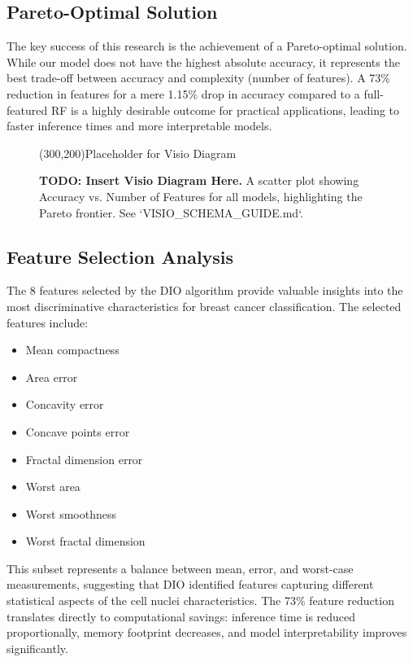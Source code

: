 \documentclass[12pt, a4paper]{article}
\begin{document}
\subsection{Pareto-Optimal Solution}
The key success of this research is the achievement of a Pareto-optimal solution. While our model does not have the highest absolute accuracy, it represents the best trade-off between accuracy and complexity (number of features). A 73\% reduction in features for a mere 1.15\% drop in accuracy compared to a full-featured RF is a highly desirable outcome for practical applications, leading to faster inference times and more interpretable models.

\begin{figure}[H]
    \centering
    \framebox(300,200){Placeholder for Visio Diagram}
    \caption{
        \textbf{TODO: Insert Visio Diagram Here.} A scatter plot showing Accuracy vs. Number of Features for all models, highlighting the Pareto frontier. See `VISIO_SCHEMA_GUIDE.md`.
    }
    \label{fig:pareto}
\end{figure}

\subsection{Feature Selection Analysis}
The 8 features selected by the DIO algorithm provide valuable insights into the most discriminative characteristics for breast cancer classification. The selected features include:
\begin{itemize}
    \item Mean compactness
    \item Area error
    \item Concavity error
    \item Concave points error
    \item Fractal dimension error
    \item Worst area
    \item Worst smoothness
    \item Worst fractal dimension
\end{itemize}
This subset represents a balance between mean, error, and worst-case measurements, suggesting that DIO identified features capturing different statistical aspects of the cell nuclei characteristics. The 73\% feature reduction translates directly to computational savings: inference time is reduced proportionally, memory footprint decreases, and model interpretability improves significantly.
\end{document}
